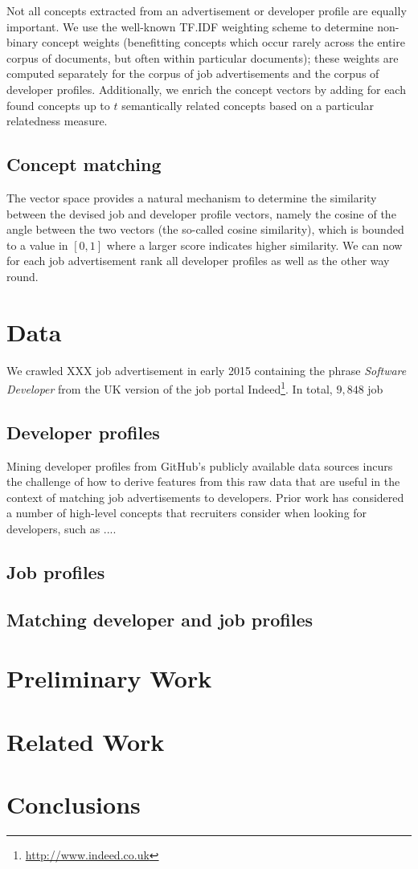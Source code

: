 \documentclass[conference]{IEEEtran}
\begin{document}
Not all concepts extracted from an advertisement or developer profile are equally important. We use the well-known TF.IDF weighting scheme to determine non-binary concept weights (benefitting concepts which occur rarely across the entire corpus of documents, but often within particular documents); these weights are computed separately for the corpus of job advertisements and the corpus of developer profiles. Additionally, we enrich the concept vectors by adding for each found concepts up to $t$ semantically related concepts based on a particular relatedness measure.

\subsection{Concept matching}

The vector space provides a natural mechanism to determine the similarity between the devised job and developer profile vectors, namely the cosine of the angle between the two vectors (the so-called cosine similarity), which is bounded to a value in $[0,1]$ where a larger score indicates higher similarity. 
We can now for each job advertisement rank all developer profiles as well as the other way round.

\section{Data}


We crawled XXX job advertisement in early 2015 containing the phrase \emph{Software Developer} from the UK version of the job portal Indeed\footnote{\url{http://www.indeed.co.uk}}. In total, $9,848$ job 


\subsection{Developer profiles}

Mining developer profiles from GitHub's publicly available data sources incurs the challenge of how to derive features from this raw data that are useful in the context of matching job advertisements to developers. Prior work has considered a number of high-level concepts that recruiters consider when looking for developers, such as ....

\subsection{Job profiles}

\subsection{Matching developer and job profiles}


\section{Preliminary Work}

\section{Related Work}

\section{Conclusions}



\end{document}
